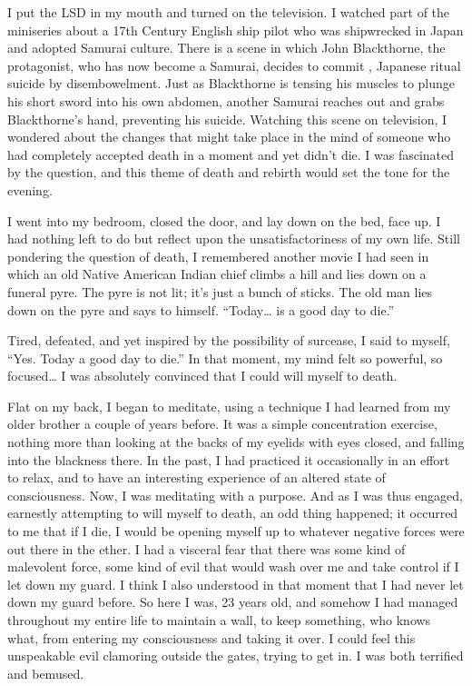 \documentclass[a5paper,10pt,english]{book}
\begin{document}
\sphinxAtStartPar
I put the LSD in my mouth and turned on the television. I watched part
of the  miniseries about a 17th Century English ship pilot who
was shipwrecked in Japan and adopted Samurai culture. There is a scene
in which John Blackthorne, the protagonist, who has now become a
Samurai, decides to commit , Japanese ritual suicide by
disembowelment. Just as Blackthorne is tensing his muscles to plunge his
short sword into his own abdomen, another Samurai reaches out and grabs
Blackthorne’s hand, preventing his suicide. Watching this scene on
television, I wondered about the changes that might take place in the
mind of someone who had completely accepted death in a moment and yet
didn’t die. I was fascinated by the question, and this theme of death
and rebirth would set the tone for the evening.

\sphinxAtStartPar
I went into my bedroom, closed the door, and lay down on the bed, face
up. I had nothing left to do but reflect upon the unsatisfactoriness of
my own life. Still pondering the question of death, I remembered another
movie I had seen in which an old Native American Indian chief climbs a
hill and lies down on a funeral pyre. The pyre is not lit; it’s just a
bunch of sticks. The old man lies down on the pyre and says to himself.
“Today… is a good day to die.”

\sphinxAtStartPar
Tired, defeated, and yet inspired by the possibility of surcease, I said
to myself, “Yes. Today  a good day to die.” In that moment, my mind
felt so powerful, so focused… I was absolutely convinced that I could
will myself to death.

\sphinxAtStartPar
Flat on my back, I began to meditate, using a technique I had learned
from my older brother a couple of years before. It was a simple
concentration exercise, nothing more than looking at the backs of my
eyelids with eyes closed, and falling into the blackness there. In the
past, I had practiced it occasionally in an effort to relax, and to have
an interesting experience of an altered state of consciousness. Now, I
was meditating with a purpose. And as I was thus engaged, earnestly
attempting to will myself to death, an odd thing happened; it occurred
to me that if I  die, I would be opening myself up to whatever
negative forces were out there in the ether. I had a visceral fear that
there was some kind of malevolent force, some kind of evil that would
wash over me and take control if I let down my guard. I think I also
understood in that moment that I had never let down my guard before. So
here I was, 23 years old, and somehow I had managed throughout my entire
life to maintain a wall, to keep something, who knows what, from
entering my consciousness and taking it over. I could feel this
unspeakable evil clamoring outside the gates, trying to get in. I was
both terrified and bemused.
\end{document}

